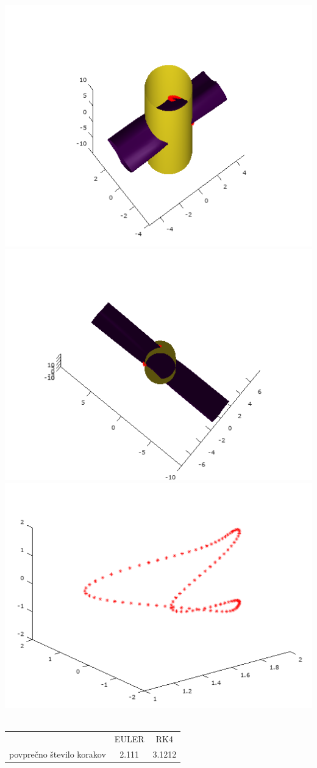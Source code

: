 \documentclass[]{article}
\begin{document}
	\includegraphics[scale=0.3]{primer8_2}\\
	\includegraphics[scale=0.3]{primer8_3}
	\includegraphics[scale=0.3]{primer8_4} \\ \\
	\begin{center}
	\begin{tabular}{ |c|c|c| } 
 		\hline
 			 & EULER & RK4 \\ 
			povprečno število korakov & 2.111 & 3.1212 \\ 
 		\hline
 	\end{tabular}
	\end{center}
	
\end{document}
